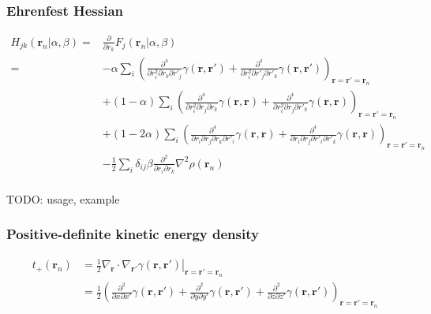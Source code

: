 \documentclass[letterpaper]{article}
\begin{document}
\subsubsection{Ehrenfest Hessian}
\begin{equation}
  \begin{split}
    H_{jk}(\mathbf{r}_n | \alpha, \beta)
    =&
    \frac{\partial}{\partial r_k} F_j(\mathbf{r}_n | \alpha, \beta)\\
    =&
    - \alpha
    \sum_i
    \left(
      \frac{\partial^4}{\partial r^2_i \partial r_k \partial r'_j} \gamma(\mathbf{r}, \mathbf{r}')
      +\frac{\partial^4}{\partial r^2_i \partial r'_j \partial r'_k} \gamma(\mathbf{r}, \mathbf{r}')
    \right)_{\mathbf{r} = \mathbf{r}' = \mathbf{r}_n}\\
    &+ (1 - \alpha)
    \sum_i
    \left(
      \frac{\partial^4}{\partial r^2_i \partial r_j \partial r_k} \gamma(\mathbf{r}, \mathbf{r})
      + \frac{\partial^4}{\partial r^2_i \partial r_j \partial r'_k} \gamma(\mathbf{r}, \mathbf{r})
    \right)_{\mathbf{r} = \mathbf{r}' = \mathbf{r}_n}\\
    &+ (1 - 2\alpha)
    \sum_i
    \left(
      \frac{\partial^4}{\partial r_i \partial r_j \partial r_k \partial r'_i} \gamma(\mathbf{r}, \mathbf{r})
      + \frac{\partial^4}{\partial r_i \partial r_j \partial r'_i \partial r'_k} \gamma(\mathbf{r}, \mathbf{r})
    \right)_{\mathbf{r} = \mathbf{r}' = \mathbf{r}_n}\\
    &- \frac{1}{2} \sum_i \delta_{ij} \beta
    \frac{\partial^2}{\partial r_i \partial r_k} \nabla^2 \rho(\mathbf{r}_n)\\
  \end{split}
\end{equation}

TODO: usage, example
\subsubsection{Positive-definite kinetic energy density}
\begin{equation}
  \begin{split}
    t_+ (\mathbf{r}_n)
    &= \frac{1}{2} \left.
      \nabla_{\mathbf{r}} \cdot \nabla_{\mathbf{r}'} \gamma(\mathbf{r}, \mathbf{r}')
    \right|_{\mathbf{r} = \mathbf{r}' = \mathbf{r}_n}\\
    &= \frac{1}{2} \left(
      \frac{\partial^2}{\partial x \partial x'} \gamma(\mathbf{r}, \mathbf{r}')
      + \frac{\partial^2}{\partial y \partial y'} \gamma(\mathbf{r}, \mathbf{r}')
      + \frac{\partial^2}{\partial z \partial z'} \gamma(\mathbf{r}, \mathbf{r}')
    \right)_{\mathbf{r} = \mathbf{r}' = \mathbf{r}_n}\\
  \end{split}
\end{equation}
\end{document}

